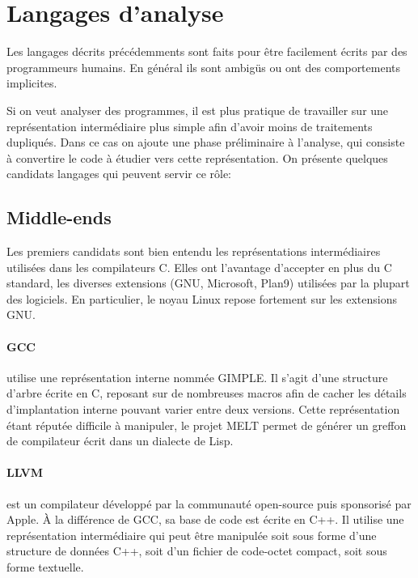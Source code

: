 \section{Langages d'analyse}

Les langages décrits précédemments sont faits pour être facilement écrits par
des programmeurs humains. En général ils sont ambigüs ou ont des comportements
implicites.

Si on veut analyser des programmes, il est plus pratique de travailler sur une
représentation intermédiaire plus simple afin d'avoir moins de traitements
dupliqués. Dans ce cas on ajoute une phase préliminaire à l'analyse, qui
consiste à convertire le code à étudier vers cette représentation. On présente
quelques candidats langages qui peuvent servir ce rôle:

\subsection*{Middle-ends}

Les premiers candidats sont bien entendu les représentations intermédiaires
utilisées dans les compilateurs C. Elles ont l'avantage d'accepter en plus du C
standard, les diverses extensions (GNU, Microsoft, Plan9) utilisées par la
plupart des logiciels. En particulier, le noyau Linux repose fortement sur les
extensions GNU.\@

\paragraph{GCC} utilise une représentation interne nommée
GIMPLE\cite{gcc-gimple}. Il s'agit d'une structure d'arbre écrite en C, reposant
sur de nombreuses macros afin de cacher les détails d'implantation interne
pouvant varier entre deux versions. Cette représentation étant réputée difficile
à manipuler, le projet MELT\cite{gcc-melt} permet de générer un greffon de
compilateur écrit dans un dialecte de Lisp.

\paragraph{LLVM}\cite{llvm-pres} est un compilateur développé par la communauté
open-source puis sponsorisé par Apple. À la différence de GCC, sa base de code
est écrite en C++. Il utilise une représentation intermédiaire qui peut être
manipulée soit sous forme d'une structure de données C++, soit d'un fichier de
code-octet compact, soit sous forme textuelle.

